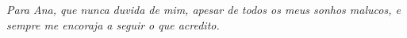 \clearpage
\thispagestyle{empty}
\null
\vfill
\begin{flushleft}
\itshape
Para Ana, que nunca duvida de mim, apesar de todos os meus sonhos malucos,
e sempre me encoraja a seguir o que acredito.
\end{flushleft}
\clearpage
